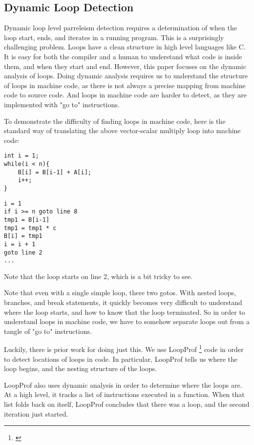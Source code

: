 \documentclass[12pt,twoside]{reedthesis}
\begin{document}
		
		\subsection{Dynamic Loop Detection}
		
		Dynamic loop level parreleism detection requires a determination of when the loop start, ends, and iterates in a running program.
		This is a surprisingly challenging problem. 
		Loops have a clean structure in high level languages like C. It is easy for both the compiler and a human to understand what code is inside them, and when they start and end. However, this paper focuses on the dynamic analysis of loops. Doing dynamic analysis requires us to understand the structure of loops in machine code, as there is not always a precise mapping from machine code to source code. And loops in machine code are harder to detect, as they are implemented with "go to" instructions.
		
		To demonstrate the difficulty of finding loops in machine code, here is the standard way of translating the above vector-scalar multiply loop into machine code:
		

		\begin{lstlisting}
int i = 1;
while(i < n){
	B[i] = B[i-1] + A[i];
	i++;
}
		\end{lstlisting}
		\begin{lstlisting}
i = 1
if i >= n goto line 8
tmp1 = B[i-1]
tmp1 = tmp1 * c
B[i] = tmp1
i = i + 1
goto line 2
...
		\end{lstlisting}
		
		Note that the loop starts on line 2, which is a bit tricky to see. 
		
		Note that even with a single simple loop, there two gotos. With nested loops, branches, and break statements, it quickly becomes very difficult to understand where the loop starts, and how to know that the loop terminated.
		So in order to understand loops in machine code, we have to somehow separate loops out from a tangle of "go to" instructions. 
		
		Luckily, there is prior work for doing just this. We use LoopProf \footnote{\cite{Chen:2004}} code in order to detect locations of loops in code. In particular, LoopProf tells us where the loop begins, and the nesting structure of the loops. 
		
		LoopProf also uses dynamic analysis in order to determine where the loops are. At a high level, it tracks a list of instructions executed in a function. When that list folds back on itself, LoopProf concludes that there was a loop, and the second iteration just started. 
		
\end{document}
